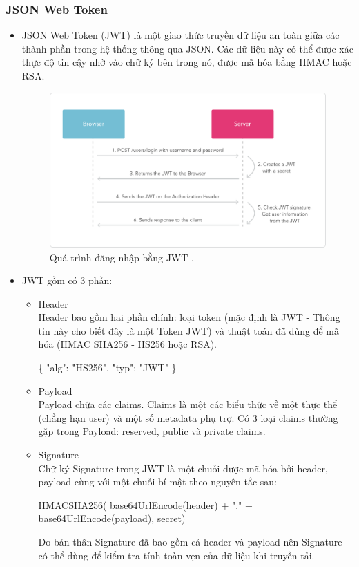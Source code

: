 \documentclass[a4paper,12pt,oneside]{article}
\begin{document}
\subsubsection{JSON Web Token \cite{jwt}}
\begin{itemize}
\item JSON Web Token (JWT) là một giao thức truyền dữ liệu an toàn giữa các thành phần trong hệ thống thông qua JSON. Các dữ liệu này có thể được xác thực độ tin cậy nhờ vào chữ ký bên trong nó, được mã hóa bằng HMAC hoặc RSA.

\begin{figure}[H]
	\centering
	\includegraphics[scale=.35]{hinh/jwt2.png}
	\caption{Quá trình đăng nhập bằng JWT \cite{jwt}.}
	\label{fig:jwt2}
\end{figure}

\item JWT gồm có 3 phần: 
\begin{itemize}
\item Header\\
Header bao gồm hai phần chính: loại token (mặc định là JWT - Thông tin này cho biết đây là một Token JWT) và thuật toán đã dùng để mã hóa (HMAC SHA256 - HS256 hoặc RSA). 

\begin{center}
\{ "alg": "HS256", "typ": "JWT" \} 
\end{center}

\item Payload\\ 
Payload chứa các claims. Claims là một các biểu thức về một thực thể (chẳng hạn user) và một số metadata phụ trợ. Có 3 loại claims thường gặp trong Payload: reserved, public và private claims. 
\item Signature\\ 
Chữ ký Signature trong JWT là một chuỗi được mã hóa bởi header, payload cùng với một chuỗi bí mật theo nguyên tắc sau: 
\begin{center}
HMACSHA256(  base64UrlEncode(header) + "." +  base64UrlEncode(payload),  secret) 
\end{center}
Do bản thân Signature đã bao gồm cả header và payload nên Signature có thể dùng để kiểm tra tính toàn vẹn của dữ liệu khi truyền tải. 
\end{itemize}
\end{itemize}
\end{document}
